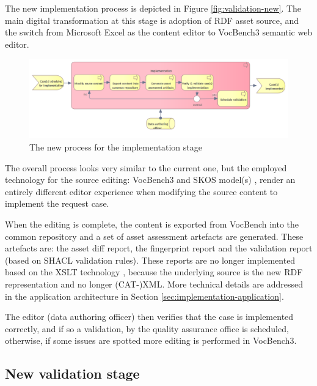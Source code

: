 	The new implementation process is depicted in Figure \ref{fig:validation-new}. The main digital transformation at this stage is adoption of RDF asset source, and the switch from Microsoft Excel as the content editor to VocBench3 \citep{stellato2017towards,stellatovocbench} semantic web editor. 
	
	\begin{figure}[h]
		\centering
		\includegraphics[width=1.05\textwidth]{images/business/new/Implementation.png}
		\caption{The new process for the implementation stage}
		\label{fig:implementation-new}
	\end{figure} 

	The overall process looks very similar to the current one, but the employed technology for the source editing: VocBench3 and SKOS model(s) \citep{skos-spec}, render an entirely different editor experience when modifying the source content to implement the request case.
	
	When the editing is complete, the content is exported from VocBench into the common repository and a set of asset assessment artefacts are generated. These artefacts are: the asset diff report, the fingerprint report and the validation report (based on SHACL \citep{shacl-spec} validation rules). These reports are no longer implemented based on the XSLT technology \citep{xslt3-Kay}, because the underlying source is the new RDF representation \citep{rdf11} and no longer (CAT-)XML. More technical details are addressed in the application architecture in Section \ref{sec:implementation-application}.
	
	The editor (data authoring officer) then verifies that the case is implemented correctly, and if so a validation, by the quality assurance office is scheduled, otherwise, if some issues are spotted more editing is performed in VocBench3.
		
	
	\subsection{New validation stage}
	\label{sec:validation-new}	
	
